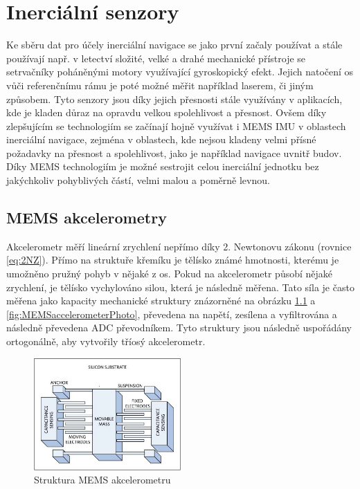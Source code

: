 \chapter{Inerciální senzory}
Ke sběru dat pro účely inerciální navigace se jako první začaly používat a stále používají např. v letectví složité, velké a drahé mechanické přístroje se setrvačníky poháněnými motory využívající gyroskopický efekt. Jejich natočení os vůči referenčnímu rámu je poté možné měřit například laserem, či jiným způsobem. Tyto senzory jsou díky jejich přesnosti stále využívány v aplikacích, kde je kladen důraz na opravdu velkou spolehlivost a přesnost. Ovšem díky zlepšujícím se technologiím se začínají hojně využívat i \ac{MEMS} \ac{IMU} v oblastech inerciální navigace, zejména v oblastech, kde nejsou kladeny velmi přísné požadavky na přesnost a spolehlivost, jako je například navigace uvnitř budov. Díky \ac{MEMS} technologiím je možné sestrojit celou inerciální jednotku bez jakýchkoliv pohyblivých částí, velmi malou a poměrně levnou.

\section{MEMS akcelerometry} \label{MEMSaccel}
Akcelerometr měří lineární zrychlení nepřímo díky 2. Newtonovu zákonu (rovnice \ref{eq:2NZ}). Přímo na struktuře křemíku je tělísko známé hmotnosti, kterému je umožněno pružný pohyb v nějaké z os. Pokud na akcelerometr působí nějaké zrychlení, je tělísko vychylováno silou, která je následně měřena. Tato síla je často měřena jako kapacity mechanické struktury znázorněné na obrázku \ref{fig:MEMSaccelerometer} a \ref{fig:MEMSaccelerometerPhoto}, převedena na napětí, zesílena a vyfiltrována a následně převedena \ac{ADC} převodníkem.
Tyto struktury jsou následně uspořádány ortogonálně, aby vytvořily tříosý akcelerometr. \cite{Dadafshar2014}

\begin{figure}[h]
    \centering
    \includegraphics[width=0.5\textwidth]{obrazky/MEMSaccelerometer}
    \caption{Struktura MEMS akcelerometru \cite{Dadafshar2014}}
    \label{fig:MEMSaccelerometer}
\end{figure}

